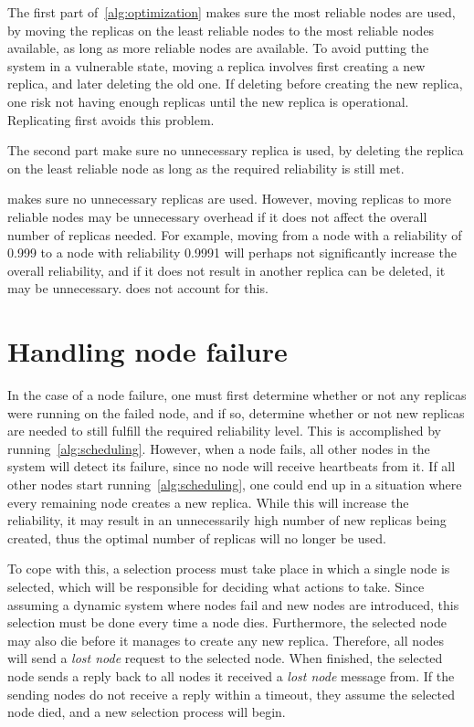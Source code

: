 \documentclass{cslthse-msc}
\begin{document}
The first part of~\cref{alg:optimization} makes sure the most reliable nodes are used, by moving the replicas on the least reliable nodes to the most reliable nodes available, as long as more reliable nodes are available. To avoid putting the system in a vulnerable state, moving a replica involves first creating a new replica, and later deleting the old one. If deleting before creating the new replica, one risk not having enough replicas until the new replica is operational. Replicating first avoids this problem.

The second part make sure no unnecessary replica is used, by deleting the replica on the least reliable node as long as the required reliability is still met.

 makes sure no unnecessary replicas are used. However, moving replicas to more reliable nodes may be unnecessary overhead if it does not affect the overall number of replicas needed. For example, moving from a node with a reliability of 0.999 to a node with reliability 0.9991 will perhaps not significantly increase the overall reliability, and if it does not result in another replica can be deleted, it may be unnecessary.  does not account for this.

\section{Handling node failure} \label{sec:design_handling_failure}
In the case of a node failure, one must first determine whether or not any replicas were running on the failed node, and if so, determine whether or not new replicas are needed to still fulfill the required reliability level. This is accomplished by running~\cref{alg:scheduling}. However, when a node fails, all other nodes in the system will detect its failure, since no node will receive heartbeats from it. If all other nodes start running~\cref{alg:scheduling}, one could end up in a situation where every remaining node creates a new replica. While this will increase the reliability, it may result in an unnecessarily high number of new replicas being created, thus the optimal number of replicas will no longer be used.

To cope with this, a selection process must take place in which a single node is selected, which will be responsible for deciding what actions to take. Since assuming a dynamic system where nodes fail and new nodes are introduced, this selection must be done every time a node dies. Furthermore, the selected node may also die before it manages to create any new replica. Therefore, all nodes will send a \emph{lost node} request to the selected node. When finished, the selected node sends a reply back to all nodes it received a \emph{lost node} message from. If the sending nodes do not receive a reply within a timeout, they assume the selected node died, and a new selection process will begin.
\end{document}
